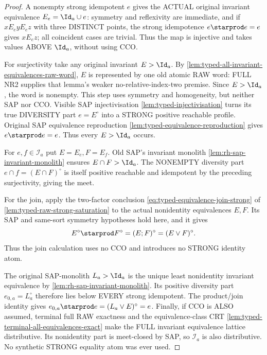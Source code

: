 \begin{proof}
A nonempty strong idempotent
$e$ gives the ACTUAL original
invariant equivalence
$E_e=\Id_a\cup e$:
symmetry and reflexivity
are immediate, and if
$xE_eyE_ez$ with three
DISTINCT points, the strong
idempotence $e\starprod e=e$
gives $xE_ez$; all coincident
cases are trivial. Thus the
map is injective and takes
values ABOVE $\Id_a$,
without using CCO.

For surjectivity take any
original invariant $E>\Id_a$.
By \cref{lem:typed-all-invariant-equivalences-raw-word}, $E$ is
represented by one old atomic RAW word: FULL NR2 supplies that lemma's
weaker no-relative-index-two premise. Since $E>\Id_a$, the word is
nonempty. This step uses symmetry and homogeneity, but neither SAP nor CCO.
Visible SAP injectivisation
\cref{lem:typed-injectivisation}
turns its true DIVERSITY part
$e=E^\circ$ into a STRONG
positive reachable profile.
Original SAP equivalence
reproduction
\cref{lem:typed-equivalence-reproduction}
gives $e\starprod e=e$.
Thus every $E>\Id_a$ occurs.

For $e,f\in\mathscr I_a$
put $E=E_e,F=E_f$.
Old SAP's invariant monolith
\cref{lem:rh-sap-invariant-monolith}
ensures $E\cap F>\Id_a$.
The NONEMPTY diversity part
$e\cap f=(E\cap F)^\circ$
is itself positive reachable
and idempotent by the preceding
surjectivity, giving the meet.

For the join, apply the two-factor conclusion
\eqref{eq:typed-equivalence-join-strong} of
\cref{lem:typed-raw-strong-saturation} to the actual nonidentity
equivalences $E,F$. Its SAP and same-sort symmetry hypotheses hold here,
and it gives
\[
       E^\circ\starprod F^\circ=(E;F)^\circ=(E\vee F)^\circ.
\]
Thus the join calculation uses no CCO and introduces no STRONG identity atom.

The original SAP-monolith
$L_a>\Id_a$ is the unique
least nonidentity invariant
equivalence by
\cref{lem:rh-sap-invariant-monolith}.
Its positive diversity part
$e_{0,a}=L_a^\circ$ therefore
lies below EVERY strong
idempotent. The product/join
identity gives
$e_{0,a}\starprod e
=(L_a\vee E)^\circ=e$.
Finally, if CCO is ALSO
assumed, terminal full
RAW exactness and the
equivalence-class CRT
\cref{lem:typed-terminal-all-equivalences-exact}
make the FULL invariant
equivalence lattice distributive.
Its nonidentity part is
meet-closed by SAP, so
$\mathscr I_a$ is also
distributive. No synthetic
STRONG equality atom was
ever used.
\end{proof}

